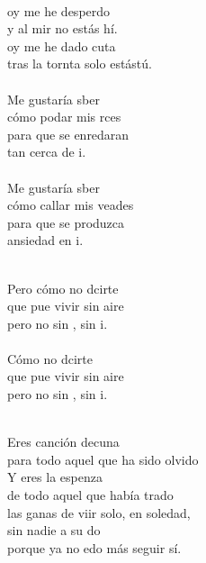 \begin{cancion}%
	    \\
	oy me he desperdo\\
	y al mir no estás hí.\\
	oy me he dado cuta\\
	tras la tornta solo estástú.\\
\jump\\
	Me gustaría sber\\
	cómo podar mis rces \\
	para que  se enredaran\\
	tan cerca de i.\\
\jump\\
	Me gustaría sber\\
	cómo callar mis veades\\
	para que  se produzca \\
	ansiedad en i.\\\jump\\
	\begin{chorus}%
	Pero cómo no dcirte\\
	que pue vivir sin aire\\
	pero no sin , sin i.\\
\jump\\
	Cómo no dcirte\\
	que pue vivir sin aire\\
	pero no sin , sin i.\\
	\end{chorus}%
	\jump\\
	Eres canción decuna\\
	para todo aquel que ha sido olvido\\
	Y eres la espenza \\
	de todo aquel que había trado\\
	las ganas de viir solo, en soledad,\\
	sin nadie a su do\\
	porque ya no edo más seguir sí.\\

\end{cancion}
